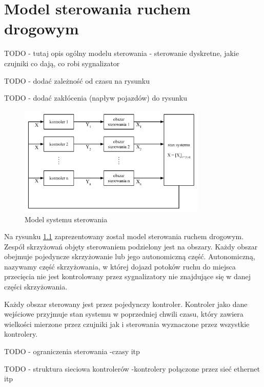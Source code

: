 \chapter{Model sterowania ruchem drogowym}
TODO - tutaj opis ogólny modelu sterowania - sterowanie dyskretne, jakie czujniki co dają, co robi sygnalizator

TODO - dodać zależność od czasu na rysunku

TODO - dodać zakłócenia (napływ pojazdów) do rysunku

\begin{figure}[h]
    \centering
    \includegraphics[width=0.8\textwidth]{images/model.pdf}
    \caption{Model systemu sterowania}
    \label{rys:model}
\end{figure}

Na rysunku \ref{rys:model} zaprezentowany został model sterowania ruchem drogowym.
Zespół skrzyżowań objęty sterowaniem podzielony jest na obszary.
Każdy obszar obejmuje pojedyncze skrzyżowanie lub jego autonomiczną część.
Autonomiczną, nazywamy część skrzyżowania, w której dojazd potoków ruchu do miejsca przecięcia nie jest kontrolowany
przez sygnalizatory nie znajdujące się w danej części skrzyżowania.

Każdy obszar sterowany jest przez pojedynczy kontroler.
Kontroler jako dane wejściowe przyjmuje stan systemu w poprzedniej chwili czasu,
który zawiera wielkości mierzone przez czujniki jak i sterowania wyznaczone przez wszystkie kontrolery.

TODO - ograniczenia sterowania -czasy itp

TODO - struktura sieciowa kontrolerów -kontrolery połączone przez sieć ethernet itp